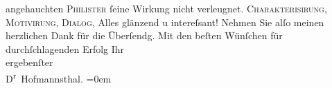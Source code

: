 \begin{ledgroupsized}[t]{13cm}
                    angehauchten \textsc{Philister} ſeine {\pb}Wirkung nicht verleugnet. \textsc{Charakterisirung}, \textsc{Motivirung}, \textsc{Dialog}, Alles glänzend u intereſsant!\pend
           \pstart
           Nehmen Sie alſo meinen herzlichen Dank für die Überſendg.\pend
           \pstart
           Mit den beſten Wünſchen für durchſchlagenden Erfolg
                            Ihr{\\[\baselineskip]}ergebenſter{\\[\baselineskip]}\spacefill\mbox{D\textsuperscript{r}
                        Hofmannsthal.}\pend
           \leftskip=0em{}\endnumbering{}\end{ledgroupsized}  \newcommand{\dateiname}{L00050}\newcommand{\titel}{Hugo August von Hofmannsthal an Arthur Schnitzler, 7. 12. 1891}\newcommand{\editorInnen}{Martin Anton Müller und Gerd-Hermann Susen}
      